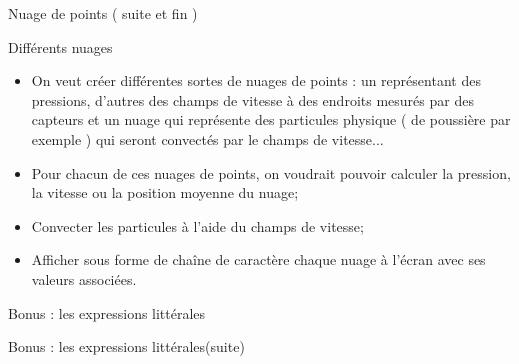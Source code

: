 \documentclass[handout,10pt]{beamer}
\newcommand{\includepartcode}[4][cpp]{

}
\begin{document}
\begin{frame}{Nuage de points ( suite et fin )}
 \begin{exampleblock}{Différents nuages}
  \begin{itemize}
   \item On veut créer différentes sortes de nuages de points : un représentant des pressions, d'autres des champs de vitesse à des endroits mesurés par des capteurs et un nuage qui représente des particules physique ( de poussière par exemple ) qui seront convectés par le champs de vitesse...
   \item Pour chacun de ces nuages de points, on voudrait pouvoir calculer la pression, la vitesse ou la position moyenne du nuage;
   \item Convecter les particules à l'aide du champs de vitesse;
   \item Afficher sous forme de chaîne de caractère chaque nuage à l'écran avec ses valeurs associées.
  \end{itemize}
 \end{exampleblock}
\end{frame}

\begin{frame}[fragile]{Bonus : les expressions littérales}
\includepartcode{litterals.cpp}{4}{37} 
\end{frame}

\begin{frame}[fragile]{Bonus : les expressions littérales(suite)}
\includepartcode{litterals.cpp}{38}{68} 
\end{frame}
\end{document}

